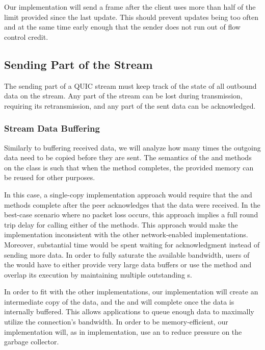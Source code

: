Our implementation will send a \MAXSTREAMDATA{} frame after the client uses more than half of the
limit provided since the last update. This should prevent updates being too often and at the same
time early enough that the sender does not run out of flow control credit.

\subsection{Sending Part of the Stream}\label{sec:03-send-stream}

The sending part of a QUIC stream must keep track of the state of all outbound data on the stream.
Any part of the stream can be lost during transmission, requiring its retransmission, and any part
of the sent data can be acknowledged.

\subsubsection{Stream Data Buffering}

Similarly to buffering received data, we will analyze how many times the outgoing data need to be
copied before they are sent. The semantics of the  and  methods on
the \Stream{} class is such that when the method completes, the provided memory can be reused for
other purposes.

In this case, a single-copy implementation approach would require that the  and
 methods complete after the peer acknowledges that the data were received. In the
best-case scenario where no packet loss occurs, this approach implies a full round trip delay for
calling either of the methods. This approach would make the \QuicStream{} implementation
inconsistent with the other network-enabled \Stream{} implementations. Moreover, substantial time
would be spent waiting for acknowledgment instead of sending more data. In order to fully saturate
the available bandwidth, users of the \QuicStream{} would have to either provide very large data
buffers or use the  method and overlap its execution by maintaining multiple
outstanding \ValueTask{}s.

In order to fit with the other \Stream{} implementations, our implementation will create an
intermediate copy of the data, and the  and  will complete once the
data is internally buffered. This allows applications to queue enough data to maximally utilize the
connection's bandwidth. In order to be memory-efficient, our implementation will, as in
\ReceiveStream{} implementation, use an \ArrayPoolOf{\Byte{}} to reduce pressure on the garbage
collector.

